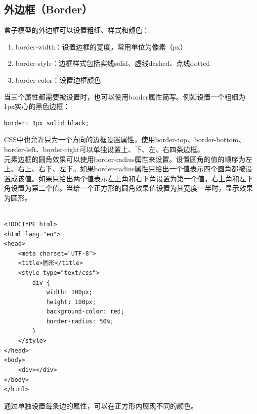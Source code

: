 \subsection{外边框（Border）}

盒子模型的外边框可以设置粗细、样式和颜色：

\begin{enumerate}
	\item border-width：设置边框的宽度，常用单位为像素（px）
	\item border-style：边框样式包括实线solid、虚线dashed、点线dotted
	\item border-color：设置边框颜色
\end{enumerate}

当三个属性都需要被设置时，也可以使用border属性简写。例如设置一个粗细为1px实心的黑色边框： \\

\begin{lstlisting}[style=htmlcssjs]
border: 1px solid black;
\end{lstlisting}

CSS中也允许只为一个方向的边框设置属性，使用border-top、border-bottom、border-left、border-right可以单独设置上、下、左、右四条边框。 \\

元素边框的圆角效果可以使用border-radius属性来设置。设置圆角的值的顺序为左上、右上、右下、左下。如果border-radius属性只给出一个值表示四个圆角都被设置成该值。如果只给出两个值表示左上角和右下角设置为第一个值，右上角和左下角设置为第二个值。当给一个正方形的圆角效果值设置为其宽度一半时，显示效果为圆形。 \\

 \\
\begin{lstlisting}[style=htmlcssjs]
<!DOCTYPE html>
<html lang="en">
<head>
    <meta charset="UTF-8">
    <title>圆形</title>
    <style type="text/css">
        div {
            width: 100px;
            height: 100px;
            background-color: red;
            border-radius: 50%;
        }
    </style>
</head>
<body>
    <div></div>
</body>
</html>
\end{lstlisting}

通过单独设置每条边的属性，可以在正方形内展现不同的颜色。

\begin{figure}[H]
	\centering
\end{figure}

